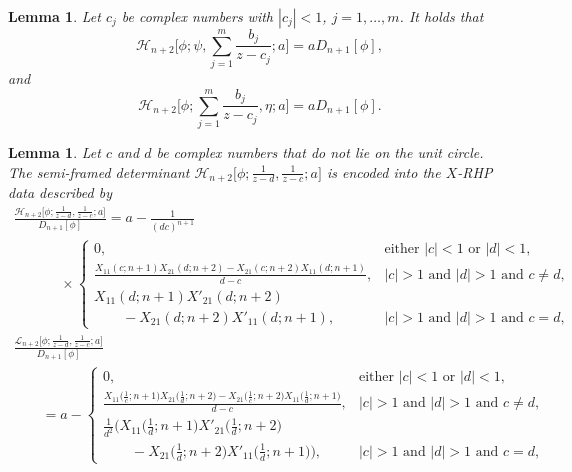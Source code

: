 \documentclass[pdftex]{sigma}
\numberwithin{equation}{section}
\newtheorem{Lemma}[Theorem]{Lemma}
 { \theoremstyle{definition}
\newtheorem{Definition}[Theorem]{Definition}
\newtheorem{Example}[Theorem]{Example}
\newtheorem{Remark}[Theorem]{Remark}
\newtheorem{Question}[Theorem]{Question}
}
\newcommand{\di}{\displaystyle}
\begin{document}
		\begin{Lemma}
			Let $c_j$ be complex numbers with $|c_j|<1$, $j=1,\dots,m$. It holds that
			\begin{equation*}
				\mathscr{H}_{n+2}\Bigg[\phi;\psi,\sum_{j=1}^{m}\frac{b_j}{z-c_j};a\Bigg] = a D_{n+1}[\phi],
			\end{equation*}
			and
			\begin{equation*}
				\mathscr{H}_{n+2}\Bigg[\phi;\sum_{j=1}^{m}\frac{b_j}{z-c_j},\eta;a\Bigg] = a D_{n+1}[\phi].
			\end{equation*}
		\end{Lemma}
		\begin{Lemma}\label{thm semi-framed rationals}
			Let $c$ and $d$ be complex numbers that do not lie on the unit circle. The semi-framed determinant $\mathscr{H}_{n+2}\big[\phi;\di \tfrac{1}{z-d},\di \tfrac{1}{z-c};a\big]$ is encoded into the $X$-RHP data described by
			\begin{gather}%
						\frac{\mathscr{H}_{n+2}\big[\phi; \tfrac{1}{z-d},\tfrac{1}{z-c};a\big]}{D_{n+1}[\phi]}
= a - \frac{1}{ (dc)^{n+1}}\nonumber \\
\phantom{\qquad = }{}\times \!\!\begin{cases}
						0, & \text{either $|c|<1$ or $|d|<1$,} \\
						 \tfrac{ X_{11}(c;n+1)X_{21}(d;n+2) - X_{21}(c;n+2)X_{11}(d;n+1) }{d-c}, & \text{$|c|>1$ and $|d|>1$ and $c \neq d$,} \\
						X_{11}(d;n+1)X'_{21}(d;n+2)&\\
 \qquad- X_{21}(d;n+2)X'_{11}(d;n+1), & \text{$|c|>1$ and $|d|>1$ and $c = d$,}
					\end{cases}\label{Hn+2 rationals X-RHP}\\
						\frac{\mathscr{L}_{n+2}\big[\phi; \tfrac{1}{z-d},\tfrac{1}{z-c};a\big]}{D_{n+1}[\phi]} \nonumber\\
\qquad= a -\! \begin{cases}
						0, & \text{either $|c|<1$ or $|d|<1$,} \\
						 \tfrac{ X_{11}\big(\tfrac{1}{c};n+1\big)X_{21}\big(\tfrac{1}{d};n+2\big) - X_{21}\big(\tfrac{1}{c};n+2\big)X_{11}\big(\tfrac{1}{d};n+1\big) }{d-c}, & \text{$|c|>1$ and $|d|>1$ and $c \neq d$}, \\
						\tfrac{1}{d^2} \big( X_{11}\big(\tfrac{1}{d};n+1\big)X'_{21}\big(\tfrac{1}{d};n+2\big) &\\
\qquad- X_{21}\big(\tfrac{1}{d};n+2\big)X'_{11}\big(\tfrac{1}{d};n+1\big) \big), & \text{$|c|>1$ and $|d|>1$ and $c = d$,}\nonumber

\end{cases}
\end{gather}
\end{Lemma}
\end{document}

